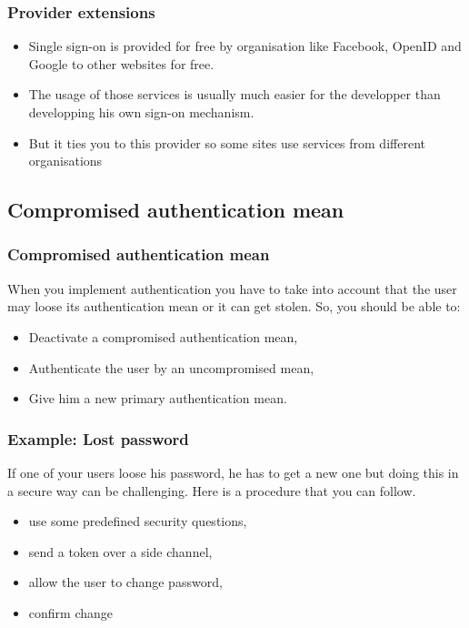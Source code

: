 \begin{frame}
\frametitle{Provider extensions}
\begin{itemize}
\item Single sign-on is provided for free by organisation like Facebook, OpenID and
Google to other websites for free.
\item The usage of those services is usually much easier for the
  developper than developping his own sign-on mechanism.
\item But it ties you to this provider so some sites use services from
  different organisations
\end{itemize}

\end{frame}

\subsection{Compromised authentication mean}

\begin{frame}
\frametitle{Compromised authentication mean}
 When you implement authentication you have to take into account that
 the user may loose its authentication mean or it can get stolen. So,
 you should be able to:

\begin{itemize}
\item Deactivate a compromised authentication mean,
\item Authenticate the user by an uncompromised mean,
\item Give him a new primary authentication mean.
\end{itemize}

\end{frame}


\begin{frame}
\frametitle{Example: Lost password}
 If one of your users loose his password, he has to get a new one but
 doing this in a secure way can be challenging. Here is a procedure
 that you can follow.

\begin{itemize}
\item use some predefined security questions,
\item send a token over a side channel,
\item allow the user to change password,
\item confirm change
\end{itemize}

\end{frame}

